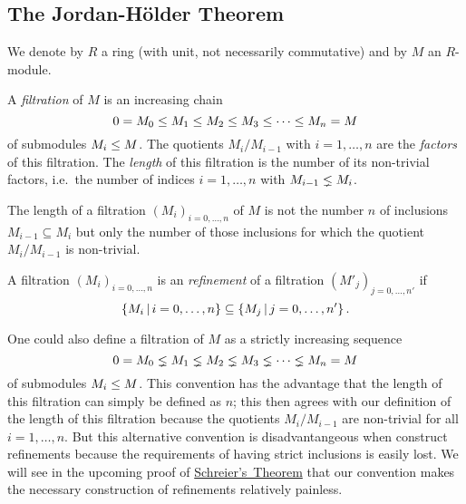 \subsection{The Jordan-Hölder Theorem}


\begin{conventions}
  We denote by $R$ a ring (with unit, not necessarily commutative) and by $M$ an $R$-module.
\end{conventions}


\begin{definition}
  \label{definition: filtration}
  A \emph{filtration} of $M$ is an increasing chain
  \[
              0
    =         M_0
    \leq M_1
    \leq M_2
    \leq M_3
    \leq \dotsb
    \leq M_n
    =         M
  \]
  of submodules $M_i \leq M$.
  The quotients $M_i/M_{i-1}$ with $i = 1, \dotsc, n$ are the \emph{factors} of this filtration.
  The \emph{length} of this filtration is the number of its non-trivial factors, i.e.\ the number of indices $i = 1, \dotsc, n$ with $M_{i-1} \lneq M_i$.
\end{definition}


\begin{warning}
  The length of a filtration $(M_i)_{i=0, \dotsc, n}$ of $M$ is not the number $n$ of inclusions $M_{i-1} \subseteq M_i$ but only the number of those inclusions for which the quotient $M_i/M_{i-1}$ is non-trivial.
\end{warning}


\begin{definition}
  A filtration $(M_i)_{i = 0, \dotsc, n}$ is an \emph{refinement} of a filtration $(M'_j)_{j = 0, \dotsc, n'}$ if
  \[
              \{ M_i \suchthat i = 0, \dotsc, n \}
    \subseteq \{ M_j \suchthat j = 0, \dotsc, n' \} \,.
  \]

\end{definition}




\begin{remark}
  One could also define a filtration of $M$ as a strictly increasing sequence
  \[
                0
    =           M_0
    \lneq  M_1
    \lneq  M_2
    \lneq  M_3
    \lneq  \dotsb
    \lneq  M_n
    =           M
  \]
  of submodules $M_i \leq M$.
  This convention has the advantage that the length of this filtration can simply be defined as $n$;
  this then agrees with our definition of the length of this filtration because the quotients $M_i/M_{i-1}$ are non-trivial for all $i = 1, \dotsc, n$.
  But this alternative convention is disadvantangeous when construct refinements because the requirements of having strict inclusions is easily lost.
  We will see in the upcoming proof of \hyperref[theorem: Schreiers theorem]{Schreier’s~Theorem} that our convention makes the necessary construction of refinements relatively painless.
\end{remark}


